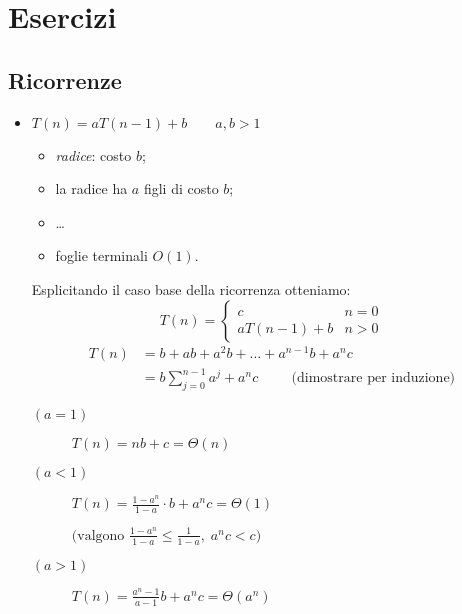 \section{Esercizi}
\subsection{Ricorrenze}

\begin{itemize}[label=$\bullet$]
	\item $T(n) = aT(n-1) + b \qquad a, b > 1$
	\begin{itemize}
		\item \emph{radice}: costo $b$;
		\item la radice ha $a$ figli di costo $b$;
		\item \dots
		\item foglie terminali $O(1)$.
	\end{itemize}
	Esplicitando il caso base della ricorrenza otteniamo:
	\[ 
		T(n) =
		\begin{cases}
			c & n = 0 \\
			aT(n-1) + b & n > 0
		\end{cases}
	\]
	\begin{align*}
		T(n) & = b + ab + a^2b + \dots + a^{n-1}b + a^nc \\
		& = b \displaystyle\sum_{j=0}^{n-1}a^j + a^nc \hspace{1cm} \text{(dimostrare per induzione)}
	\end{align*}
	\begin{description}
		\item[$(a=1)$] $T(n) = nb + c = \Theta(n)$
		\item[$(a<1)$] $T(n) = \frac{1-a^n}{1-a} \cdot b + a^n c = \Theta(1)$ \par
		$\text{(valgono } \frac{1-a^n}{1-a} \leq \frac{1}{1-a}, \; a^nc < c \text{)}$
		\item[$(a>1)$] $T(n) = \frac{a^n-1}{a-1}b + a^n c = \Theta(a^n)$
	\end{description}
\end{itemize}